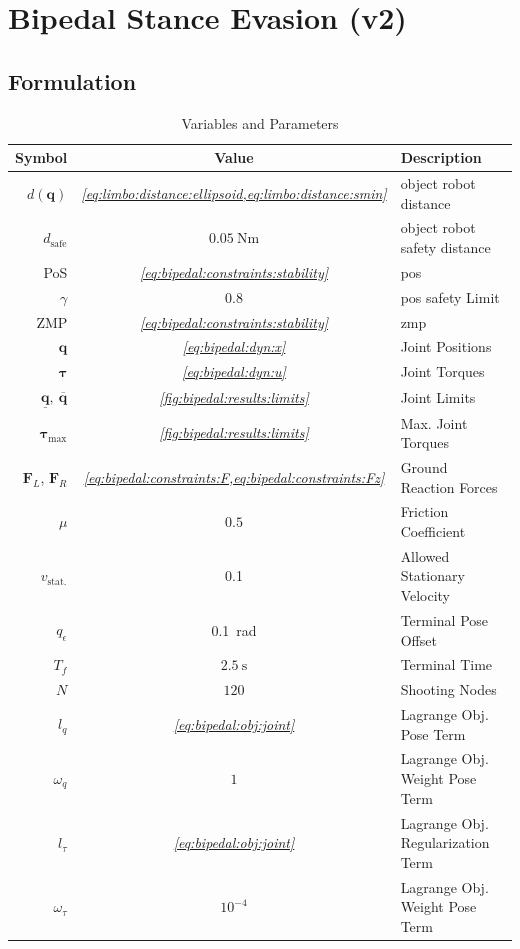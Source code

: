 \section{Bipedal Stance Evasion (v2)} \label{sec:bipedal}

\subsection{Formulation}
\begin{table}
  \caption{Variables and Parameters}
  \centering
  \begin{tabularx}{0.7\textwidth}{rcl}
  \toprule
    Symbol & Value & \multicolumn{1}{X}{Description} \\
  \midrule
    $d(\bm q)$ & \textit{\cref{eq:limbo:distance:ellipsoid,eq:limbo:distance:smin}} & object robot distance \\
    $d_\text{safe}$ & $\SI{0.05}{\newton\metre}$ & object robot safety distance \\
  \midrule
  PoS & \textit{\cref{eq:bipedal:constraints:stability}} & \acrlong{pos} \\
    $\gamma$ & $0.8$ & \acrshort{pos} safety Limit \\
    ZMP & \textit{\cref{eq:bipedal:constraints:stability}} & \acrlong{zmp} \\
  \midrule
    $\bm q$ & \textit{\cref{eq:bipedal:dyn:x}} & Joint Positions \\
  $\bm{\tau}$ & \textit{\cref{eq:bipedal:dyn:u}} & Joint Torques \\
    \midrule
  $\bm{\underline q},\ \bm{\overline q}$ & \textit{\cref{fig:bipedal:results:limits}} & Joint Limits \\
    $\bm{\tau}_{\text{max}}$ & \textit{\cref{fig:bipedal:results:limits}} & Max. Joint Torques \\
  \midrule
  $\bm F_L$, $\bm F_R$ & \textit{\cref{eq:bipedal:constraints:F,eq:bipedal:constraints:Fz}} & Ground Reaction Forces \\
    $\mu$ & $0.5$ & Friction Coefficient \\
  \midrule
    $v_{\text{stat.}}$ & \SI{0.1}{\frac{\metre}{\second}} & Allowed Stationary Velocity \\
    $q_\epsilon$ & \SI{0.1}{\radian} & Terminal Pose Offset \\
  \midrule
    $T_f$ & $\SI{2.5}{\second}$ & Terminal Time \\
    $N$ & $120$ & Shooting Nodes \\
    $l_q$ & \textit{\cref{eq:bipedal:obj:joint}} & Lagrange Obj. Pose Term \\
    $\omega_q$ & $1$ & Lagrange Obj. Weight Pose Term \\
    $l_\tau$ & \textit{\cref{eq:bipedal:obj:joint}} & Lagrange Obj. Regularization Term \\
    $\omega_\tau$ & $10^{-4}$ & Lagrange Obj. Weight Pose Term \\
  \bottomrule
  \end{tabularx} \label{tab:bipedal:variables}
\end{table}

